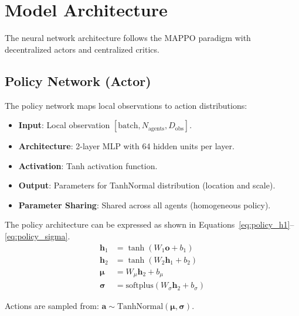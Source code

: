 \documentclass[11pt,a4paper]{article}
\begin{document}
\section{Model Architecture}
\label{sec:model_architecture}

The neural network architecture follows the MAPPO paradigm with decentralized actors and centralized critics.

\subsection{Policy Network (Actor)}
\label{subsec:policy_network}

The policy network maps local observations to action distributions:

\begin{itemize}
    \item \textbf{Input}: Local observation $[\text{batch}, N_{\text{agents}}, D_{\text{obs}}]$.
    \item \textbf{Architecture}: 2-layer MLP with 64 hidden units per layer.
    \item \textbf{Activation}: Tanh activation function.
    \item \textbf{Output}: Parameters for TanhNormal distribution (location and scale).
    \item \textbf{Parameter Sharing}: Shared across all agents (homogeneous policy).
\end{itemize}

The policy architecture can be expressed as shown in Equations~\ref{eq:policy_h1}--\ref{eq:policy_sigma}.
\begin{align}
    \mathbf{h}_1 &= \tanh(W_1 \mathbf{o} + b_1) \label{eq:policy_h1} \\
    \mathbf{h}_2 &= \tanh(W_2 \mathbf{h}_1 + b_2) \label{eq:policy_h2} \\
    \boldsymbol{\mu} &= W_\mu \mathbf{h}_2 + b_\mu \label{eq:policy_mu} \\
    \boldsymbol{\sigma} &= \text{softplus}(W_\sigma \mathbf{h}_2 + b_\sigma) \label{eq:policy_sigma}
\end{align}

Actions are sampled from: $\mathbf{a} \sim \text{TanhNormal}(\boldsymbol{\mu}, \boldsymbol{\sigma})$.
\end{document}
